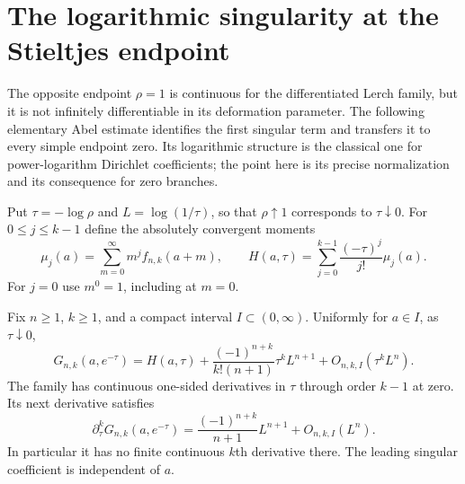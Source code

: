 
\section{The logarithmic singularity at the Stieltjes endpoint}
\label{lerchboundary:sec:abel}

The opposite endpoint $\rho=1$ is continuous for the differentiated
Lerch family, but it is not infinitely differentiable in its deformation
parameter.  The following elementary Abel estimate identifies the first
singular term and transfers it to every simple endpoint zero.  Its
logarithmic structure is the classical one for power-logarithm
Dirichlet coefficients; the point here is its precise normalization
and its consequence for zero branches.

Put $\tau=-\log\rho$ and $L=\log(1/\tau)$, so that
$\rho\uparrow1$ corresponds to $\tau\downarrow0$.  For
$0\leq j\leq k-1$ define the absolutely convergent moments
\begin{equation}\label{lerchboundary:eq:moments}
 \mu_j(a)=\sum_{m=0}^{\infty}m^j f_{n,k}(a+m),
 \qquad
 H(a,\tau)=\sum_{j=0}^{k-1}\frac{(-\tau)^j}{j!}\mu_j(a).
\end{equation}
For $j=0$ use $m^0=1$, including at $m=0$.

\begin{theorem}
\label{lerchboundary:thm:abel}
Fix $n\geq1$, $k\geq1$, and a compact interval $I\subset(0,\infty)$.
Uniformly for $a\in I$, as $\tau\downarrow0$,
\begin{equation}\label{lerchboundary:eq:abel}
 G_{n,k}(a,e^{-\tau})=H(a,\tau)
 +\frac{(-1)^{n+k}}{k!(n+1)}\tau^k L^{n+1}
 +O_{n,k,I}(\tau^k L^n).
\end{equation}
The family has continuous one-sided derivatives in $\tau$ through
order $k-1$ at zero. Its next derivative satisfies
\begin{equation}\label{lerchboundary:eq:abel-derivative}
 \partial_\tau^kG_{n,k}(a,e^{-\tau})
 =\frac{(-1)^{n+k}}{n+1}L^{n+1}+O_{n,k,I}(L^n).
\end{equation}
In particular it has no finite continuous $k$th derivative there.
The leading singular coefficient is independent of $a$.
\end{theorem}

